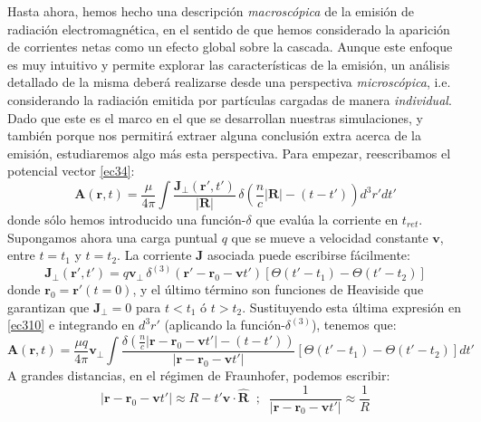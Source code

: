 \documentclass[12 pt, a4paper]{article} %
\numberwithin{equation}{section}
\numberwithin{figure}{section}
\numberwithin{table}{section}
\newcommand{\vect}[1]{\boldsymbol{\mathbf{#1}}}
\begin{document}
Hasta ahora, hemos hecho una descripción \textit{macroscópica} de la emisión de radiación electromagnética, en el sentido de que hemos considerado la aparición de corrientes netas como un efecto global sobre la cascada. Aunque este enfoque es muy intuitivo y permite explorar las características de la emisión, un análisis detallado de la misma deberá realizarse desde una perspectiva \textit{microscópica}, i.e. considerando la radiación emitida por partículas cargadas de manera \textit{individual}. Dado que este es el marco en el que se desarrollan nuestras simulaciones, y también porque nos permitirá extraer alguna conclusión extra acerca de la emisión, estudiaremos algo más esta perspectiva. Para empezar, reescribamos el potencial vector \eqref{ec34}:
\begin{equation}
	\vect{A}\left(\vect{r}, t\right)=\frac{\mu}{4\pi}\int \frac{\vect{J}_\perp\left(\vect{r}', t'\right)}{\left|\vect{R}\right|}\,\delta\left(\frac{n}{c}\left|\vect{R}\right|-\left(t-t'\right)\right)d^3r'dt'\label{ec310}
\end{equation} 
donde sólo hemos introducido una función-$\delta$ que evalúa la corriente en $t_{ret}$. Supongamos ahora una carga puntual $q$ que se mueve a velocidad constante $\vect{v}$, entre $t=t_1$ y $t=t_2$. La corriente $\vect{J}$ asociada puede escribirse fácilmente:
\begin{equation}
	\vect{J}_\perp\left(\vect{r'}, t'\right)=q\vect{v}_\perp \,\delta^{(3)}\left(\vect{r}'-\vect{r}_0-\vect{v}t'\right)\left[\Theta\left(t'-t_1\right)-\Theta\left(t'-t_2\right)\right]\label{ec311}
\end{equation}
donde $\vect{r}_0=\vect{r}'\left(t=0\right)$, y el último término son funciones de Heaviside que garantizan que $\vect{J}_\perp=0$ para $t<t_1$ ó $t>t_2$. Sustituyendo esta última expresión en \eqref{ec310} e integrando en $d^3r'$ (aplicando la función-$\delta^{(3)}$), tenemos que:
\begin{equation}
	\vect{A}\left(\vect{r}, t\right)=\frac{\mu q}{4\pi}\vect{v}_\perp\int \frac{\delta\left(\frac{n}{c} \left|\vect{r}-\vect{r}_0-\vect{v}t'\right|-\left(t-t'\right)\right)}{\left|\vect{r}-\vect{r}_0-\vect{v}t'\right|}\left[\Theta\left(t'-t_1\right)-\Theta\left(t'-t_2\right)\right]dt'\label{ec312}
\end{equation}
A grandes distancias, en el régimen de Fraunhofer, podemos escribir:
\begin{equation}
	\left|\vect{r}-\vect{r}_0-\vect{v}t'\right|\approx R-t'\vect{v}\cdot\hat{\vect{R}}\;\;;\;\;\frac{1}{\left|\vect{r}-\vect{r}_0-\vect{v}t'\right|} \approx \frac{1}{R}\label{ec313}
\end{equation}
\end{document}
